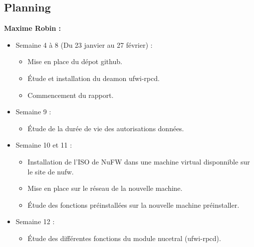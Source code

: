 \documentclass[12pt]{report}
\begin{document}
\begin{itemize}
\chapter{Planning}
\textbf{Maxime Robin :}
\begin{itemize}
  \item Semaine 4 à 8 (Du 23 janvier au 27 février) :
  \begin{itemize}
    \item Mise en place du dépot github.
    \item Étude et installation du deamon ufwi-rpcd.
    \item Commencement du rapport.
  \end{itemize}
  \item Semaine 9 :
  \begin{itemize}
    \item Étude de la durée de vie des autorisations données.
  \end{itemize}
  \item Semaine 10 et 11 :
  \begin{itemize}
    \item Installation de l'ISO de NuFW dans une machine virtual disponnible sur le site de nufw.
    \item Mise en place sur le réseau de la nouvelle machine.
    \item Étude des fonctions préinstallées sur la nouvelle machine préinstaller.
  \end{itemize}
  \item Semaine 12 :
  \begin{itemize}
    \item Étude des différentes fonctions du module nucetral (ufwi-rpcd).
  \end{itemize}
\end{itemize}


\end{itemize}
\end{document}
